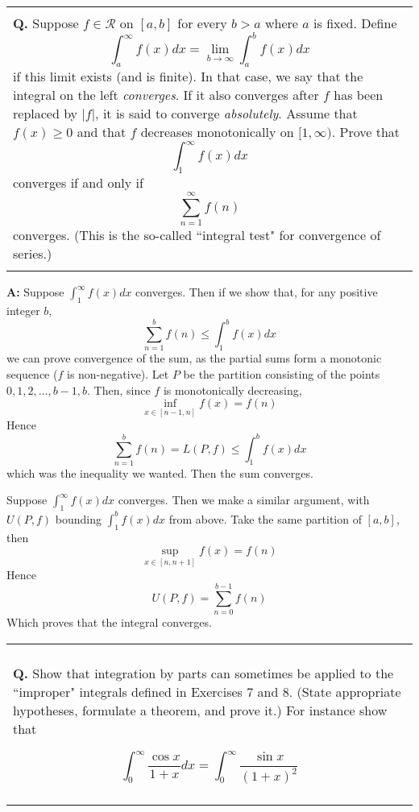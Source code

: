 \documentclass{article}
\newenvironment{myboxed}{\noindent\begin{tabular}{|p{.975\linewidth}|}\hline \\}{\\\\\hline\end{tabular}}
\newcounter{Question}
\newenvironment{Question} 
{\bigskip\begin{myboxed}\refstepcounter{Question}\par\noindent\textbf{Q\theQuestion.}}
{\end{myboxed}\bigskip}
\newenvironment{Answer} {\par\noindent\textbf{A:}} {}
\begin{document}
\newpage
\begin{Question}
    Suppose $f \in \mathscr{R}$ on $[a, b]$ for every $b > a$ where $a$ is fixed. Define 
    \[\int_a^\infty f(x) dx = \lim_{b \to \infty} \int_a^b f(x) dx\]
    if this limit exists (and is finite). In that case, we say that the integral on the left \textit{converges}. If it also converges after $f$ has been replaced by $|f|$, it is said to converge \textit{absolutely}.
    Assume that $f(x) \geq 0$ and that $f$ decreases monotonically on $[1, \infty)$. Prove that
    \[\int_1^\infty f(x) dx\] 
    converges if and only if
    \[\sum_{n=1}^\infty f(n)\] 
    converges. (This is the so-called ``integral test" for convergence of series.)
\end{Question}
\begin{Answer}
    Suppose $\int_1^\infty f(x) dx$ converges. Then if we show that, for any positive integer $b$,
    \[\sum_{n=1}^b f(n) \leq \int_1^b f(x) dx\]
    we can prove convergence of the sum, as the partial sums form a monotonic sequence ($f$ is non-negative).
    Let $P$ be the partition consisting of the points $0, 1, 2, \ldots, b-1, b$. Then, since $f$ is monotonically decreasing, 
    \[\inf_{x \in [n-1, n]} f(x) = f(n)\]
    Hence 
    \[\sum_{n=1}^b f(n) = L(P, f) \leq \int_1^b f(x) dx \]
    which was the inequality we wanted. Then the sum converges.
    
    Suppose $\int_1^\infty f(x) dx$ converges. Then we make a similar argument, with $U(P, f)$ bounding $\int_1^b f(x) dx$ from above. Take the same partition of $[a, b]$, then 
    \[\sup_{x \in [n, n+1]} f(x) = f(n)\]
    Hence 
    \[U(P, f) = \sum_{n=0}^{b-1} f(n)\]
    Which proves that the integral converges.
\end{Answer}


\begin{Question}
    Show that integration by parts can sometimes be applied to the ``improper" integrals defined in Exercises $7$ and $8$. (State appropriate hypotheses, formulate a theorem, and prove it.) For instance show that

    \[\int_0^\infty \frac{\cos x}{1+x} dx = \int_0^\infty \frac{\sin x}{(1+x)^2}\]
\end{Question}
\end{document}

